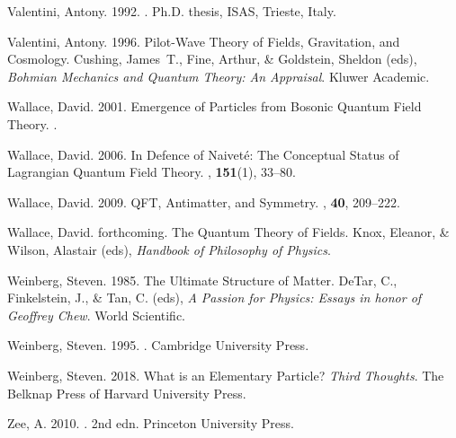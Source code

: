 \documentclass[onecolumn,secnumarabic,amsmath,amssymb,balancelastpage,nofootinbib]{article}
\begin{document}
\begin{thebibliography}{}
Valentini, Antony. 1992.
.
\newblock Ph.D. thesis, ISAS, Trieste, Italy.

Valentini, Antony. 1996.
\newblock Pilot-Wave Theory of Fields, Gravitation, and Cosmology.
 Cushing, James~T., Fine, Arthur, \&
  Goldstein, Sheldon (eds), {\em Bohmian Mechanics and Quantum Theory: An
  Appraisal}.
\newblock Kluwer Academic.

Wallace, David. 2001.
\newblock Emergence of Particles from Bosonic Quantum Field Theory.
.

Wallace, David. 2006.
\newblock In Defence of Naivet\'{e}: The Conceptual Status of Lagrangian
  Quantum Field Theory.
, {\bf 151}(1), 33--80.

Wallace, David. 2009.
\newblock QFT, Antimatter, and Symmetry.
, {\bf 40},
  209--222.

Wallace, David. forthcoming.
\newblock The Quantum Theory of Fields.
 Knox, Eleanor, \& Wilson, Alastair (eds), {\em Handbook of
  Philosophy of Physics}.

Weinberg, Steven. 1985.
\newblock The Ultimate Structure of Matter.
 DeTar, C., Finkelstein, J., \& Tan, C.
  (eds), {\em A Passion for Physics: Essays in honor of Geoffrey Chew}.
\newblock World Scientific.

Weinberg, Steven. 1995.
.
\newblock Cambridge University Press.

Weinberg, Steven. 2018.
\newblock What is an Elementary Particle?
 {\em Third Thoughts}.
\newblock The Belknap Press of Harvard University Press.

Zee, A. 2010.
. 2nd edn.
\newblock Princeton University Press.

\end{thebibliography}
\end{document}
